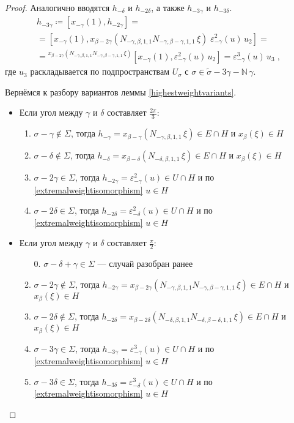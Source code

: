 \documentclass[10pt]{article}
\theoremstyle{remark}
\newcommand{\N}{\mathbb{N}}
\begin{document}
\begin{proof}
Аналогично вводятся $h_{-\delta}$ и $h_{-2\delta}$, а также $h_{-3\gamma}$ и $h_{-3\delta}$.
\begin{multline*}
h_{-3\gamma} \coloneqq [x_{-\gamma}(1),h_{-2\gamma}] = \\ =
[x_{-\gamma}(1), x_{\beta-2\gamma}(N_{-\gamma,\beta,1,1} N_{-\gamma,\beta-\gamma,1,1} \, \xi) \; \varepsilon^2_{-\gamma}(u) \, u_2] = \\ =
{}^{x_{\beta-2\gamma}(N_{-\gamma,\beta,1,1} N_{-\gamma,\beta-\gamma,1,1} \, \xi)}[x_{-\gamma}(1),\varepsilon^2_{-\gamma}(u) \, u_2] =
\varepsilon^3_{-\gamma}(u) \, u_3
 \; ,
\end{multline*}
где $u_3$ раскладывается по подпространствам $U_\sigma$ с $\sigma \in \widetilde\sigma-3\gamma - \N \, \gamma$.

Вернёмся к разбору вариантов леммы \ref{highestweightvariants}.
\begin{itemize}
\item Если угол между $\gamma$ и $\delta$ составляет $\frac{2\pi}{3}$:
\begin{enumerate}
\item $ \sigma - \gamma \notin \Sigma$, тогда $h_{-\gamma}=x_{\beta-\gamma}(N_{-\gamma,\beta,1,1} \,\xi)\in E\cap H$ и $x_\beta(\xi)\in H$
\item $ \sigma - \delta \notin \Sigma$, тогда $h_{-\delta}=x_{\beta-\delta}(N_{-\delta,\beta,1,1} \,\xi)\in E\cap H$ и $x_\beta(\xi)\in H$
\item $ \sigma - 2\gamma \in \Sigma$, тогда $h_{-2\gamma}=\varepsilon_{-\gamma}^2(u)\in U\cap H$ и по \ref{extremalweightisomorphism} $u\in H$
\item $ \sigma - 2\delta \in \Sigma$, тогда $h_{-2\delta}=\varepsilon_{-\delta}^2(u)\in U\cap H$ и по \ref{extremalweightisomorphism} $u\in H$
\end{enumerate}
\item Если угол между $\gamma$ и $\delta$ составляет $\frac{\pi}{2}$:
\begin{enumerate}
\item[0.] $ \sigma - \delta + \gamma \in \Sigma$ --- случай разобран ранее
\item $ \sigma - 2\gamma \notin \Sigma$, тогда $h_{-2\gamma}=x_{\beta-2\gamma}(N_{-\gamma,\beta,1,1}N_{-\gamma,\beta-\gamma,1,1} \,\xi)\in E\cap H$ и $x_\beta(\xi)\in H$
\item $ \sigma - 2\delta \notin \Sigma$, тогда $h_{-2\delta}=x_{\beta-2\delta}(N_{-\delta,\beta,1,1}N_{-\delta,\beta-\delta,1,1} \,\xi)\in E\cap H$ и $x_\beta(\xi)\in H$
\item $ \sigma - 3\gamma \in \Sigma$, тогда $h_{-3\gamma}=\varepsilon_{-\gamma}^3(u)\in U\cap H$ и по \ref{extremalweightisomorphism} $u\in H$
\item $ \sigma - 3\delta \in \Sigma$, тогда $h_{-3\delta}=\varepsilon_{-\delta}^3(u)\in U\cap H$ и по \ref{extremalweightisomorphism} $u\in H$
\end{enumerate}
\end{itemize}
\end{proof}
\end{document}
